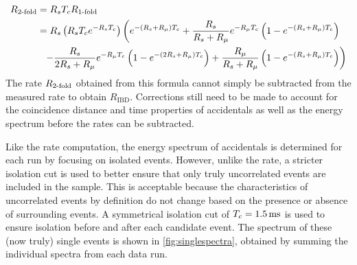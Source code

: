 \begin{align}
    \label{eq:racc}
    \begin{split}
        R_{\text{\fold{2}}} &= R_s\tc R_{\text{\fold{1}}} \\
                   &= R_s \left(R_s\tc e^{-R_s\tc}\right)
          \left(
              e^{-(R_s + R_\mu)\tc} +
              \frac{R_s}{R_s+R_\mu} e^{-R_\mu\tc}
              \left(
                  1 - e^{-(R_s + R_\mu)\tc}
              \right)
          \right. \\
          &\ \ %
          \left. - \frac{R_s}{2R_s + R_\mu} e^{-R_\mu\tc}
              \left(
                  1 - e^{-(2R_s + R_\mu)\tc}
              \right) +
              \frac{R_\mu}{R_s + R_\mu}
              \left(
                  1 - e^{-(R_s + R_\mu)\tc}
              \right)
          \right)
    \end{split}
\end{align}
The rate $R_{\text{\ensuremath{2}-fold}}$ obtained from this formula
cannot simply be subtracted from the measured  rate
to obtain $R_{\text{IBD}}$.
Corrections still need to be made to account for
the coincidence distance and time properties of accidentals
as well as the energy spectrum
before the rates can be subtracted.

Like the rate computation, the energy spectrum of accidentals is determined for each run
by focusing on isolated events.
However, unlike the rate, a stricter isolation cut is used
to better ensure that only truly uncorrelated events are included in the sample.
This is acceptable because the characteristics of uncorrelated events
by definition do not change based on the presence or absence
of surrounding events.
A symmetrical isolation cut of $T_c=\SI{1.5}{\milli\second}$ is used
to ensure isolation before and after each candidate event.
The spectrum of these (now truly) single events is shown in \cref{fig:singlespectra},
obtained by summing the individual spectra from each data run.


